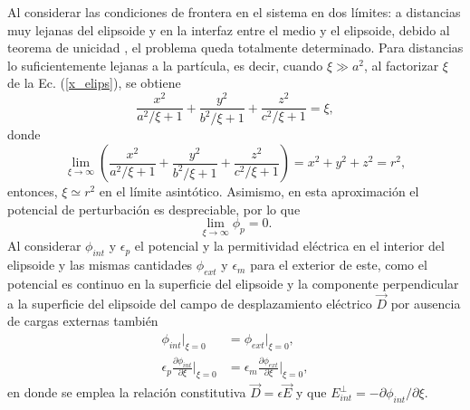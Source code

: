 Al considerar las condiciones de frontera en el sistema en dos límites: a distancias muy lejanas del elipsoide y en la interfaz entre el medio y el elipsoide, debido al teorema de unicidad \cite{Griffiths}, el problema queda totalmente determinado. Para distancias lo suficientemente lejanas a la partícula, es decir, cuando $\xi\gg a^2$, al factorizar $\xi$ de  la Ec. (\ref{x_elips}), se obtiene
\begin{equation*}
    \frac{x^2}{a^2/\xi+1}+\frac{y^2}{b^2/\xi+1}+\frac{z^2}{c^2/\xi+1}=\xi,
\end{equation*}
donde
\begin{equation*}
    \lim_{\xi\rightarrow\infty}\left(\frac{x^2}{a^2/\xi+1}+\frac{y^2}{b^2/\xi+1}+\frac{z^2}{c^2/\xi+1}\right)=x^2+y^2+z^2=r^2,
\end{equation*}
entonces, $\xi \simeq r^2$ en el límite asintótico. Asimismo, en esta aproximación el potencial de perturbación es despreciable, por lo que 
\begin{equation}
\lim_{\xi\rightarrow\infty}\phi_p=0
\label{limitephi_p}.
\end{equation}
Al considerar $\phi_{int}$ y $\epsilon_p$ el potencial y la permitividad eléctrica en el interior del elipsoide y las mismas cantidades $\phi_{ext}$ y $\epsilon_m$ para el exterior de este, como el potencial es continuo en la superficie del elipsoide y la componente perpendicular a la superficie del elipsoide del campo de desplazamiento eléctrico $\Vec{D}$ por ausencia de cargas externas también \cite{Griffiths}
\begin{subequations}
\label{condicionesfrontera}
\begin{align}
    \phi_{int}|_{\xi=0}&=\phi_{ext}|_{\xi=0}\label{cf1},\\
    \epsilon_p\frac{\partial \phi_{int}}{\partial \xi}\Big |_{\xi=0}&=
    \epsilon_m\frac{\partial \phi_{ext}}{\partial \xi}\Big |_{\xi=0}\label{cf2},
\end{align}
\end{subequations}
en donde se emplea la relación constitutiva $\Vec{D}=\epsilon\Vec{E}$ y que $E_{int}^{\perp}=-\partial \phi_{int} /\partial \xi$.\\



